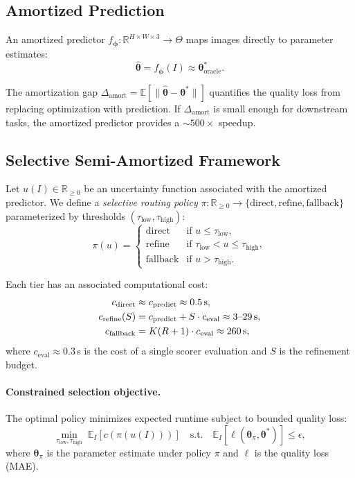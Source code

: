 \documentclass[11pt,a4paper]{article}
\newcommand{\btheta}{\boldsymbol{\theta}}
\newcommand{\bphi}{\boldsymbol{\phi}}
\newcommand{\Real}{\mathbb{R}}
\newcommand{\Expect}{\mathbb{E}}
\begin{document}
\subsection{Amortized Prediction}

An amortized predictor $f_\bphi: \Real^{H \times W \times 3} \to \Theta$ maps
images directly to parameter estimates:
\begin{equation}
\hat{\btheta} = f_\bphi(I) \approx \btheta^*_\text{oracle}.
\end{equation}

The amortization gap $\Delta_\text{amort} = \Expect[\|\hat{\btheta} - \btheta^*\|]$
quantifies the quality loss from replacing optimization with prediction.
If $\Delta_\text{amort}$ is small enough for downstream tasks,
the amortized predictor provides a ${\sim}500\times$ speedup.

\subsection{Selective Semi-Amortized Framework}

Let $u(I) \in \Real_{\geq 0}$ be an uncertainty function associated with
the amortized predictor. We define a \emph{selective routing policy}
$\pi: \Real_{\geq 0} \to \{\text{direct}, \text{refine}, \text{fallback}\}$
parameterized by thresholds $(\tau_\text{low}, \tau_\text{high})$:
\begin{equation}
\pi(u) = \begin{cases}
\text{direct} & \text{if } u \leq \tau_\text{low}, \\
\text{refine} & \text{if } \tau_\text{low} < u \leq \tau_\text{high}, \\
\text{fallback} & \text{if } u > \tau_\text{high}.
\end{cases}
\label{eq:routing}
\end{equation}

Each tier has an associated computational cost:
\begin{align}
c_\text{direct} &\approx c_\text{predict} \approx 0.5\text{\,s}, \\
c_\text{refine}(S) &= c_\text{predict} + S \cdot c_\text{eval} \approx 3\text{--}29\text{\,s}, \\
c_\text{fallback} &= K(R+1) \cdot c_\text{eval} \approx 260\text{\,s},
\end{align}
where $c_\text{eval} \approx 0.3$\,s is the cost of a single scorer evaluation
and $S$ is the refinement budget.

\paragraph{Constrained selection objective.}
The optimal policy minimizes expected runtime subject to bounded quality loss:
\begin{equation}
\min_{\tau_\text{low}, \tau_\text{high}} \; \Expect_I[c(\pi(u(I)))]
\quad \text{s.t.} \quad \Expect_I[\ell(\btheta_{\pi}, \btheta^*)] \leq \epsilon,
\label{eq:constrained}
\end{equation}
where $\btheta_\pi$ is the parameter estimate under policy $\pi$
and $\ell$ is the quality loss (MAE).
\end{document}
